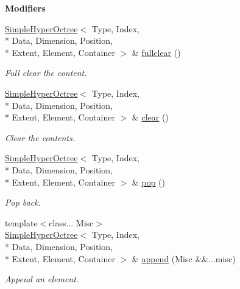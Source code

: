 \begin{Indent}{\bf Modifiers}\par
\begin{DoxyCompactItemize}
\item 
\hyperlink{exceptionmagrathea_1_1SimpleHyperOctree}{Simple\-Hyper\-Octree}$<$ Type, Index, \\*
Data, Dimension, Position, \\*
Extent, Element, Container $>$ \& \hyperlink{exceptionmagrathea_1_1SimpleHyperOctree_aad95f7803bc1260ec92a4caecdd7dc46}{fullclear} ()
\begin{DoxyCompactList}\small\item\em Full clear the content. \end{DoxyCompactList}\item 
\hyperlink{exceptionmagrathea_1_1SimpleHyperOctree}{Simple\-Hyper\-Octree}$<$ Type, Index, \\*
Data, Dimension, Position, \\*
Extent, Element, Container $>$ \& \hyperlink{exceptionmagrathea_1_1SimpleHyperOctree_a4442c66d922fb9ac4261b950f18d1330}{clear} ()
\begin{DoxyCompactList}\small\item\em Clear the contents. \end{DoxyCompactList}\item 
\hyperlink{exceptionmagrathea_1_1SimpleHyperOctree}{Simple\-Hyper\-Octree}$<$ Type, Index, \\*
Data, Dimension, Position, \\*
Extent, Element, Container $>$ \& \hyperlink{exceptionmagrathea_1_1SimpleHyperOctree_adc569fa304d13dfabf8ff6efc70ec9b4}{pop} ()
\begin{DoxyCompactList}\small\item\em Pop back. \end{DoxyCompactList}\item 
{\footnotesize template$<$class... Misc$>$ }\\\hyperlink{exceptionmagrathea_1_1SimpleHyperOctree}{Simple\-Hyper\-Octree}$<$ Type, Index, \\*
Data, Dimension, Position, \\*
Extent, Element, Container $>$ \& \hyperlink{exceptionmagrathea_1_1SimpleHyperOctree_ad6951c7477f9dc646ed7d8fc830e951e}{append} (Misc \&\&...misc)
\begin{DoxyCompactList}\small\item\em Append an element. \end{DoxyCompactList}\item 

\end{DoxyCompactItemize}
\end{Indent}
